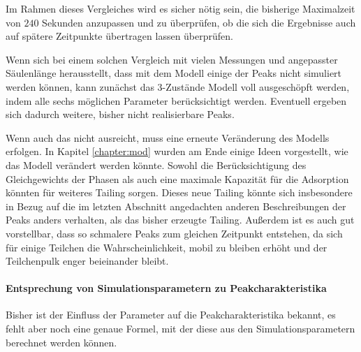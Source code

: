 Im Rahmen dieses Vergleiches wird es sicher nötig sein, die bisherige Maximalzeit von $240$ Sekunden anzupassen und zu überprüfen, ob die sich die Ergebnisse auch auf spätere Zeitpunkte übertragen lassen überprüfen. 

Wenn sich bei einem solchen Vergleich mit vielen Messungen und angepasster Säulenlänge herausstellt, dass mit dem Modell einige der Peaks nicht simuliert werden können, kann zunächst das 3-Zustände Modell voll ausgeschöpft werden, indem alle sechs möglichen Parameter berücksichtigt werden. Eventuell ergeben sich dadurch weitere, bisher nicht realisierbare Peaks.

Wenn auch das nicht ausreicht, muss eine erneute Veränderung des Modells erfolgen.
In Kapitel \ref{chapter:mod} wurden am Ende einige Ideen vorgestellt, wie das Modell verändert werden könnte.
Sowohl die Berücksichtigung des Gleichgewichts der Phasen als auch eine maximale Kapazität für die Adsorption könnten für weiteres Tailing sorgen. Dieses neue Tailing könnte sich insbesondere in Bezug auf die im letzten Abschnitt angedachten anderen Beschreibungen der Peaks anders verhalten, als das bisher erzeugte Tailing. 
Außerdem ist es auch gut vorstellbar, dass so schmalere Peaks zum gleichen Zeitpunkt entstehen, da sich für einige Teilchen die Wahrscheinlichkeit, mobil zu bleiben erhöht und der Teilchenpulk enger beieinander bleibt.


% 
% 
% 


\paragraph{Entsprechung von Simulationsparametern zu Peakcharakteristika}
Bisher ist der Einfluss der Parameter auf die Peakcharakteristika bekannt, es fehlt aber noch eine genaue Formel, mit der diese aus den Simulationsparametern berechnet werden können. 

